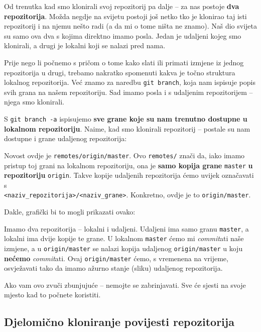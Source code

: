 Od trenutka kad smo klonirali svoj repozitorij pa dalje -- za nas postoje \textbf{dva repozitorija}.
Možda negdje na svijetu postoji još netko tko je klonirao taj isti repozitorij i na njemu nešto radi (a da mi o tome ništa ne znamo).
Naš dio svijeta su samo ova dva s kojima direktno imamo posla. 
Jedan je udaljeni kojeg smo klonirali, a drugi je lokalni koji se nalazi pred nama.

Prije nego li počnemo s pričom o tome kako slati ili primati izmjene iz jednog repozitorija u drugi, trebamo nakratko spomenuti kakva je točno struktura lokalnog repozitorija.
Već znamo za naredbu \verb+git branch+, koja nam ispisuje popis svih grana na našem repozitoriju.
Sad imamo posla i s udaljenim repozitorijem -- njega smo klonirali.

S \verb+git branch -a+ ispisujemo \textbf{sve grane koje su nam trenutno dostupne u lokalnom repozitoriju}.
Naime, kad smo klonirali repozitorij -- postale su nam dostupne i grane udaljenog repozitorija:



Novost ovdje je \verb+remotes/origin/master+.
Ovo \verb+remotes/+ znači da, iako imamo pristup toj grani na lokalnom repozitoriju, ona je \textbf{samo kopija grane} \verb+master+ \textbf{u repozitoriju} \verb+origin+.
Takve kopije udaljenih repozitorija ćemo uvijek označavati s \\ \verb+<naziv_repozitorija>/<naziv_grane>+.
Konkretno, ovdje je to \verb+origin/master+.

Dakle, grafički bi to mogli prikazati ovako:



Imamo dva repozitorija -- lokalni i udaljeni.
Udaljeni ima samo granu \verb+master+, a lokalni ima dvije kopije te grane. 
U lokalnom \verb+master+ ćemo mi \emph{commit}ati naše izmjene, a u \verb+origin/master+ se nalazi kopija udaljenog \verb+origin/master+ u koju \textbf{nećemo} \emph{commit}ati.
Ovaj \verb+origin/master+ ćemo, s vremenena na vrijeme, osvježavati tako da imamo ažurno stanje (sliku) udaljenog repozitorija.

Ako vam ovo zvuči zbunjujuće -- nemojte se zabrinjavati.
Sve će sjesti na svoje mjesto kad to počnete koristiti.

\subsection*{Djelomično kloniranje povijesti repozitorija}

